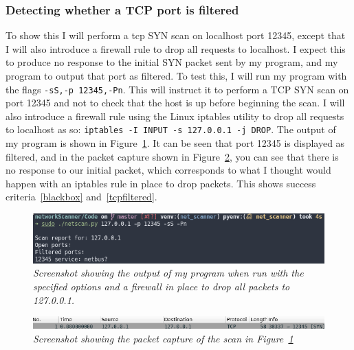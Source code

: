 \documentclass[titlepage]{article}
\let\Oldsubsubsection\subsubsection{}
\renewcommand{\subsubsection}{\FloatBarrier\Oldsubsubsection}
\begin{document}
\subsubsection{Detecting whether a TCP port is filtered}
To show this I will perform a \gls{tcp} SYN scan on localhost port 12345,
except that I will also introduce a firewall rule to drop all requests to localhost.
I expect this to produce no response to the initial SYN packet sent by my
program, and my program to output that port as filtered. To test this, I will
run my program with the flags \verb|-sS,-p 12345,-Pn|. 
This will instruct it to perform a TCP SYN scan on port 12345 and not to check that the
host is up before beginning the scan.
I will also introduce a firewall rule using the Linux iptables utility to drop
all requests to localhost as so: \verb|iptables -I INPUT -s 127.0.0.1 -j DROP|.
The output of my program is shown in Figure~\ref{tcpfilteredoutput}.
It can be seen that port 12345 is displayed as filtered, and in the packet capture shown in
Figure~\ref{tcpfilteredpcap}, you can see that there is no response to our initial packet,
which corresponds to what I thought would happen with an iptables rule in place
to drop packets. This shows success criteria~\ref{blackbox} and~\ref{tcpfiltered}.

\begin{figure}[H]
  \centering
  \includegraphics[width=\textwidth]{tcpfilteredoutput.png}
  \caption{\textit{%
    Screenshot showing the output of my program when run with the specified options
    and a firewall in place to drop all packets to 127.0.0.1.
}}\label{tcpfilteredoutput}
\end{figure}

\begin{figure}[H]
  \centering
  \includegraphics[width=\textwidth]{tcpfilteredpcap.png}
  \caption{\textit{%
    Screenshot showing the packet capture of the scan in Figure~\ref{tcpfilteredoutput}
}}\label{tcpfilteredpcap}
\end{figure}
\end{document}
